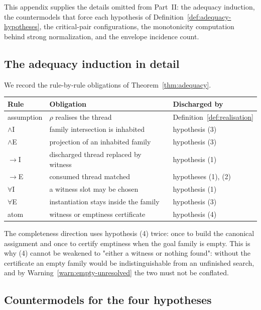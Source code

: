\label{app:proofs-body}

This appendix supplies the details omitted from Part~II: the adequacy induction, the
countermodels that force each hypothesis of
Definition~\ref{def:adequacy-hypotheses}, the critical-pair configurations, the monotonicity
computation behind strong normalization, and the envelope incidence count.

\subsection{The adequacy induction in detail}

We record the rule-by-rule obligations of Theorem~\ref{thm:adequacy}.

\begin{center}
\begin{tabular}{@{}p{}p{}p{}@{}}
\toprule
Rule & Obligation & Discharged by \\
\midrule
assumption & $\rho$ realises the thread & Definition~\ref{def:realisation} \\
$\wedge$I & family intersection is inhabited & hypothesis (3) \\
$\wedge$E & projection of an inhabited family & hypothesis (3) \\
$\to$I & discharged thread replaced by witness & hypothesis (1) \\
$\to$E & consumed thread matched & hypotheses (1), (2) \\
$\forall$I & a witness slot may be chosen & hypothesis (1) \\
$\forall$E & instantiation stays inside the family & hypothesis (3) \\
atom & witness or emptiness certificate & hypothesis (4) \\
\bottomrule
\end{tabular}
\end{center}

The completeness direction uses hypothesis (4) twice: once to build the canonical assignment
and once to certify emptiness when the goal family is empty.  This is why (4) cannot be
weakened to "either a witness or nothing found": without the certificate an empty family
would be indistinguishable from an unfinished search, and by
Warning~\ref{warn:empty-unresolved} the two must not be conflated.

\subsection{Countermodels for the four hypotheses}

